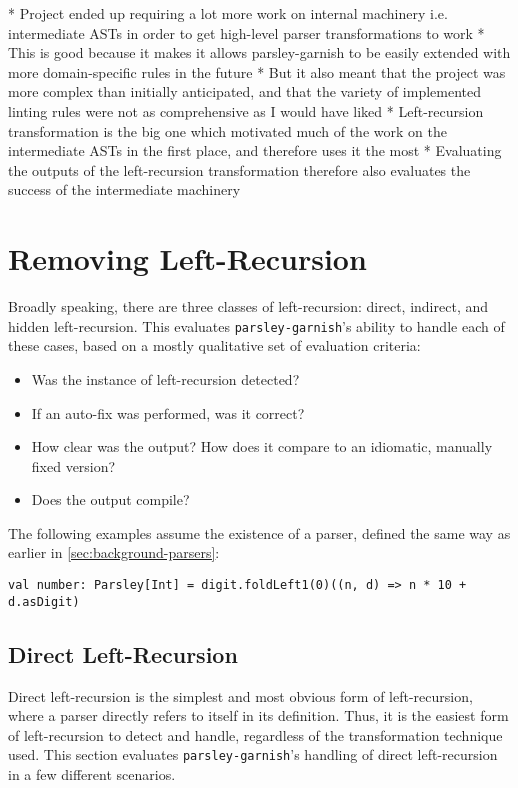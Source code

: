 \documentclass[../../main.tex]{subfiles}
\begin{document}
\label{sec:evaluation}

* Project ended up requiring a lot more work on internal machinery i.e. intermediate ASTs in order to get high-level parser transformations to work
* This is good because it makes it allows parsley-garnish to be easily extended with more domain-specific rules in the future
* But it also meant that the project was more complex than initially anticipated, and that the variety of implemented linting rules were not as comprehensive as I would have liked
* Left-recursion transformation is the big one which motivated much of the work on the intermediate ASTs in the first place, and therefore uses it the most
* Evaluating the outputs of the left-recursion transformation therefore also evaluates the success of the intermediate machinery

\section{Removing Left-Recursion}\label{sec:eval-leftrec}
Broadly speaking, there are three classes of left-recursion: direct, indirect, and hidden left-recursion.
This  evaluates \texttt{parsley-garnish}'s ability to handle each of these cases, based on a mostly qualitative set of evaluation criteria:
\begin{itemize}
  \item Was the instance of left-recursion detected?
  \item If an auto-fix was performed, was it correct?
  \item How clear was the output? How does it compare to an idiomatic, manually fixed version?
  \item Does the output compile?
\end{itemize}
%
The following examples assume the existence of a  parser, defined the same way as earlier in \cref{sec:background-parsers}:
\begin{verbatim}
val number: Parsley[Int] = digit.foldLeft1(0)((n, d) => n * 10 + d.asDigit)
\end{verbatim}

\subsection{Direct Left-Recursion}
Direct left-recursion is the simplest and most obvious form of left-recursion, where a parser directly refers to itself in its definition.
Thus, it is the easiest form of left-recursion to detect and handle, regardless of the transformation technique used.
This section evaluates \texttt{parsley-garnish}'s handling of direct left-recursion in a few different scenarios.
\end{document}

